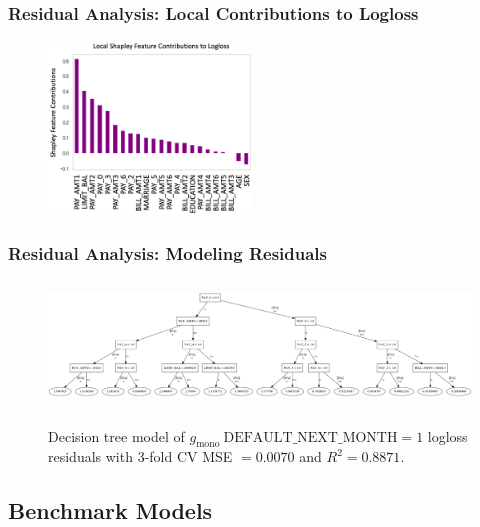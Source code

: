 \documentclass[11pt,
               aspectratio=43,
               hyperref={colorlinks}
               ]{beamer}
\begin{document}
			\begin{frame}
		
				\frametitle{\textbf{Residual Analysis}: Local Contributions to Logloss}
		
		
				\begin{figure}[htb]
					\begin{center}
						\includegraphics[height=130pt]{img/local.png}
					\end{center}
				\end{figure}	
		
			\end{frame}

			\begin{frame}
		
				\frametitle{\textbf{Residual Analysis}: Modeling Residuals}
				\begin{figure}[htb]
					\begin{center}
						\includegraphics[height=95pt, width=330pt]{img/surrogate_dt_1.png}
					\end{center}
				\vspace{10pt}
				\footnotesize{Decision tree model of $g_{\text{mono}} ~\text{DEFAULT\_NEXT\_MONTH} =1$ logloss residuals with 3-fold CV MSE $=0.0070$ and $R^2=0.8871$}.
				\end{figure}	
		
			\end{frame}
			
		\subsection{Benchmark Models}
\end{document}
